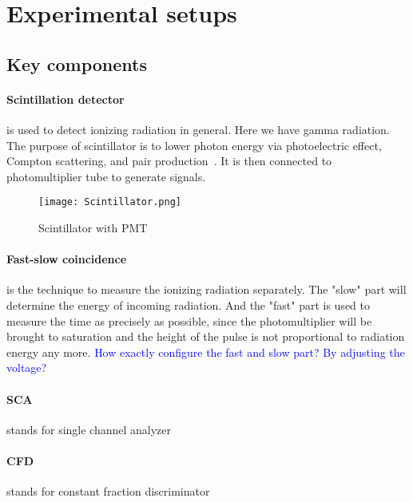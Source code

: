 \section{Experimental setups}

\subsection{Key components}
\paragraph{Scintillation detector}
is used to detect ionizing radiation in general. Here we have gamma radiation. The purpose of scintillator is to lower photon energy via photoelectric effect, Compton scattering, and pair production~\cite{wermes}. It is then connected to photomultiplier tube to generate signals.
\begin{figure}[ht]
   \centering
   \texttt{[image: Scintillator.png]}
   \caption{Scintillator with PMT~\cite{wikiScin}}%
\end{figure}

\paragraph{Fast-slow coincidence} is the technique to measure the ionizing radiation separately. The "slow" part will determine the energy of incoming radiation. And the "fast" part is used to measure the time as precisely as possible, since the photomultiplier will be brought to saturation and the height of the pulse is not proportional to radiation energy any more. \textcolor{blue}{How exactly configure the fast and slow part? By adjusting the voltage?}

\paragraph{SCA} stands for single channel analyzer

\paragraph{CFD} stands for constant fraction discriminator

